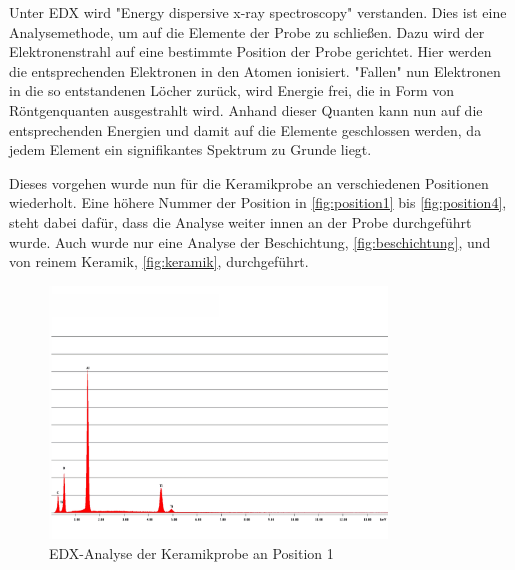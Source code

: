 \documentclass[12pt,english,ngerman]{scrartcl}
\begin{document}
Unter EDX wird "Energy dispersive x-ray spectroscopy" verstanden. Dies ist eine Analysemethode, um auf die Elemente der 
Probe zu schließen. Dazu wird der Elektronenstrahl auf eine bestimmte Position der Probe gerichtet. Hier werden die
entsprechenden Elektronen in den Atomen ionisiert. "Fallen" nun Elektronen in die so entstandenen Löcher zurück, wird
Energie frei, die in Form von Röntgenquanten ausgestrahlt wird. Anhand dieser Quanten kann nun auf die entsprechenden
Energien und damit auf die Elemente geschlossen werden, da jedem Element ein signifikantes Spektrum zu Grunde liegt.


Dieses vorgehen wurde nun für die Keramikprobe an verschiedenen Positionen wiederholt. Eine höhere Nummer der Position
in \autoref{fig:position1} bis \autoref{fig:position4},
steht dabei dafür, dass die Analyse weiter innen an der Probe durchgeführt wurde. Auch wurde nur eine Analyse
der Beschichtung, \autoref{fig:beschichtung}, und von reinem Keramik, \autoref{fig:keramik}, durchgeführt. 

\begin{figure}[H]
	\begin{center}
		\includegraphics[width =0.8\textwidth]{./figures/edx1.png}
	\end{center}
	\caption{EDX-Analyse der Keramikprobe an Position 1 \cite{sein_foto}}
    \label{fig:position1}
\end{figure}
\end{document}
